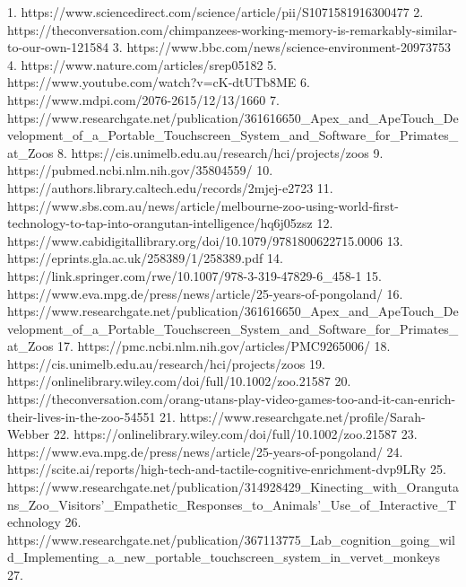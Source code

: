 1.	https://www.sciencedirect.com/science/article/pii/S1071581916300477 
2.	https://theconversation.com/chimpanzees-working-memory-is-remarkably-similar-to-our-own-121584
3.	https://www.bbc.com/news/science-environment-20973753
4.	https://www.nature.com/articles/srep05182
5.	https://www.youtube.com/watch?v=cK-dtUTb8ME
6.	https://www.mdpi.com/2076-2615/12/13/1660
7.	https://www.researchgate.net/publication/361616650_Apex_and_ApeTouch_Development_of_a_Portable_Touchscreen_System_and_Software_for_Primates_at_Zoos
8.	https://cis.unimelb.edu.au/research/hci/projects/zoos
9.	https://pubmed.ncbi.nlm.nih.gov/35804559/
10.	https://authors.library.caltech.edu/records/2mjej-e2723
11.	https://www.sbs.com.au/news/article/melbourne-zoo-using-world-first-technology-to-tap-into-orangutan-intelligence/hq6j05zsz
12.	https://www.cabidigitallibrary.org/doi/10.1079/9781800622715.0006
13.	https://eprints.gla.ac.uk/258389/1/258389.pdf
14.	https://link.springer.com/rwe/10.1007/978-3-319-47829-6_458-1
15.	https://www.eva.mpg.de/press/news/article/25-years-of-pongoland/
16.	https://www.researchgate.net/publication/361616650_Apex_and_ApeTouch_Development_of_a_Portable_Touchscreen_System_and_Software_for_Primates_at_Zoos
17.	https://pmc.ncbi.nlm.nih.gov/articles/PMC9265006/
18.	https://cis.unimelb.edu.au/research/hci/projects/zoos
19.	https://onlinelibrary.wiley.com/doi/full/10.1002/zoo.21587
20.	https://theconversation.com/orang-utans-play-video-games-too-and-it-can-enrich-their-lives-in-the-zoo-54551
21.	https://www.researchgate.net/profile/Sarah-Webber
22.	https://onlinelibrary.wiley.com/doi/full/10.1002/zoo.21587
23.	https://www.eva.mpg.de/press/news/article/25-years-of-pongoland/
24.	https://scite.ai/reports/high-tech-and-tactile-cognitive-enrichment-dvp9LRy
25.	https://www.researchgate.net/publication/314928429_Kinecting_with_Orangutans_Zoo_Visitors'_Empathetic_Responses_to_Animals'_Use_of_Interactive_Technology
26.	https://www.researchgate.net/publication/367113775_Lab_cognition_going_wild_Implementing_a_new_portable_touchscreen_system_in_vervet_monkeys
27.		
